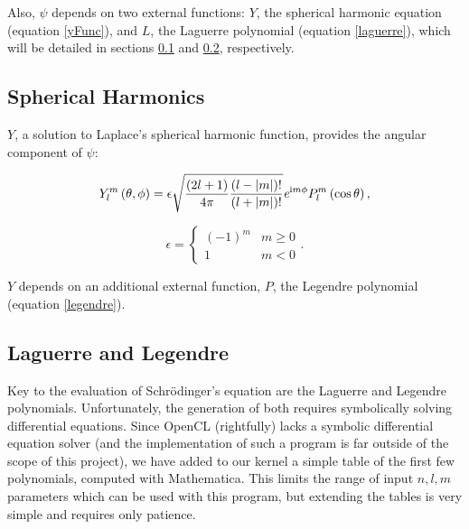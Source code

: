 \documentclass{acmsiggraph}
\begin{document}
Also, $\psi$ depends on two external functions: $Y$, the spherical harmonic equation (equation \ref{yFunc}), and $L$, the Laguerre polynomial (equation \ref{laguerre}), which will be detailed in sections \ref{sphericalHarmonics} and \ref{laguerreLegendre}, respectively.

\subsection{Spherical Harmonics}

\label{sphericalHarmonics}

$Y$, a solution to Laplace's spherical harmonic function, provides the angular component of $\psi$:

\begin{equation}\label{yFunc}
Y_l^m\left(\theta,\phi\right)=\epsilon
\sqrt{\frac{\left(2l+1\right)}{4\pi}
    \frac{\left(l-\left|m\right|\right)!}{\left(l+\left|m\right|\right)!}}
\mathit{e}^{{\rm i}m\phi}
P^m_l\left(\cos\theta\right),
\end{equation}

\begin{equation}\label{yEpsilon}
\epsilon=\begin{cases}
\left(-1\right)^m & \text{$m\ge0$} \\
1 & \text{$m<0$}
\end{cases}.
\end{equation}

$Y$ depends on an additional external function, $P$, the Legendre polynomial (equation \ref{legendre}).

\subsection{Laguerre and Legendre}

\label{laguerreLegendre}

Key to the evaluation of Schr\"{o}dinger's equation are the Laguerre and Legendre polynomials. Unfortunately, the generation of both requires symbolically solving differential equations. \cite{legendreCite} Since OpenCL (rightfully) lacks a symbolic differential equation solver (and the implementation of such a program is far outside of the scope of this project), we have added to our kernel a simple table of the first few polynomials, computed with Mathematica. This limits the range of input $n, l, m$ parameters which can be used with this program, but extending the tables is very simple and requires only patience.
\end{document}
